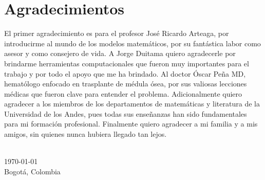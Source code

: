 \chapter*{Agradecimientos}
El primer agradecimiento es para el profesor José Ricardo Arteaga, por introducirme al mundo de los modelos matemáticos, por su fantástica labor como asesor y como consejero de vida. A Jorge Duitama quiero agradecerle por brindarme herramientas computacionales que fueron muy importantes para el trabajo y por todo el apoyo que me ha brindado. Al doctor Óscar Peña MD, hematólogo enfocado en trasplante de médula ósea, por sus valiosas lecciones médicas que fueron clave para entender el problema. Adicionalmente quiero agradecer a los miembros de los departamentos de matemáticas y literatura de la Universidad de los Andes, pues todas sus enseñanzas han sido fundamentales para mi formación profesional. Finalmente quiero agradecer a mi familia y a mis amigos, sin quienes nunca hubiera llegado tan lejos.   




{
\makeatletter
\vspace{1cm}
\raggedleft
\@author{}\\
\today{}\\
Bogotá, Colombia\\
\raggedright
\makeatother
}
